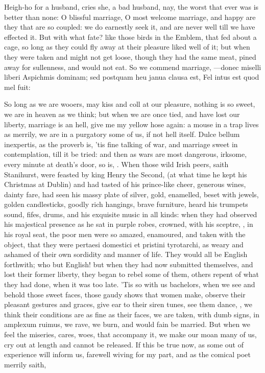 {Heigh-ho for a husband, cries she, a bad husband, nay, the worst that
ever was is better than none: O blissful marriage, O most welcome
marriage, and happy are they that are so coupled: we do earnestly seek
it, and are never well till we have effected it. But with what fate?
like those birds in the Emblem, that fed about a cage, so long as
they could fly away at their pleasure liked well of it; but when they
were taken and might not get loose, though they had the same meat,
pined away for sullenness, and would not eat. So we commend marriage,
---donec miselli liberi
Aspichmis dominam; sed postquam heu janua clausa est,
Fel intus est quod mel fuit:

So long as we are wooers, may kiss and coll at our pleasure, nothing is
so sweet, we are in heaven as we think; but when we are once tied, and
have lost our liberty, marriage is an hell, give me my yellow hose
again: a mouse in a trap lives as merrily, we are in a purgatory some
of us, if not hell itself. Dulce bellum inexpertis, as the proverb is,
'tis fine talking of war, and marriage sweet in contemplation, till it
be tried: and then as wars are most dangerous, irksome, every minute at
death's door, so is, \etc{}. When those wild Irish peers, saith
Stanihurst, were feasted by king Henry the Second, (at what time
he kept his Christmas at Dublin) and had tasted of his prince-like
cheer, generous wines, dainty fare, had seen his massy plate of
silver, gold, enamelled, beset with jewels, golden candlesticks, goodly
rich hangings, brave furniture, heard his trumpets sound, fifes, drums,
and his exquisite music in all kinds: when they had observed his
majestical presence as he sat in purple robes, crowned, with his
sceptre, \etc{}, in his royal seat, the poor men were so amazed,
enamoured, and taken with the object, that they were pertaesi domestici
et pristini tyrotarchi, as weary and ashamed of their own sordidity and
manner of life. They would all be English forthwith; who but English!
but when they had now submitted themselves, and lost their former
liberty, they began to rebel some of them, others repent of what they
had done, when it was too late. 'Tis so with us bachelors, when we see
and behold those sweet faces, those gaudy shows that women make,
observe their pleasant gestures and graces, give ear to their siren
tunes, see them dance, \etc{}, we think their conditions are as fine as
their faces, we are taken, with dumb signs, in amplexum ruimus, we
rave, we burn, and would fain be married. But when we feel the
miseries, cares, woes, that accompany it, we make our moan many of us,
cry out at length and cannot be released. If this be true now, as some
out of experience will inform us, farewell wiving for my part, and as
the comical poet merrily saith,

}
